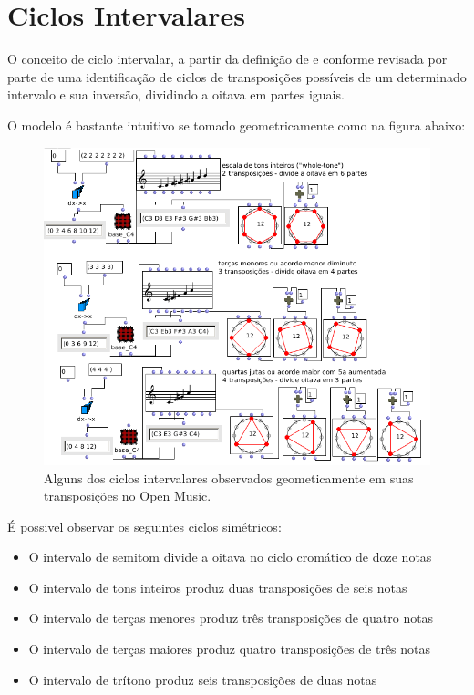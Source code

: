 \documentclass[
	12pt,				%
	openright,			%
	twoside,			%
	a4paper,			%
	english,			%
	french,				%
	spanish,			%
	brazil				%
	]{abntex2}
\begin{document}
\section{Ciclos Intervalares}

O conceito de ciclo intervalar, a partir da definição de  e conforme revisada por  parte de uma identificação de ciclos de transposições possíveis de um determinado intervalo e sua inversão, dividindo a oitava em partes iguais.

O modelo é bastante intuitivo se tomado geometricamente como na figura abaixo:

\begin{figure}[!h]
	\caption{\label{fig_grafico}Alguns dos ciclos intervalares observados geometicamente em suas transposições no Open Music.  }
	\begin{center}
	    \includegraphics[scale=0.5]{ciclos/ciclosOM.png}
	\end{center}
\end{figure}

É possivel observar os seguintes ciclos simétricos:

\begin{itemize}
\item O intervalo de semitom divide a oitava no ciclo cromático de doze notas
\item O intervalo de tons inteiros produz duas transposições de seis notas
\item O intervalo de terças menores produz três transposições de quatro notas
\item O intervalo de terças maiores produz quatro transposições de três notas
\item O intervalo de trítono produz seis transposições de duas notas
\end{itemize}
\end{document}
